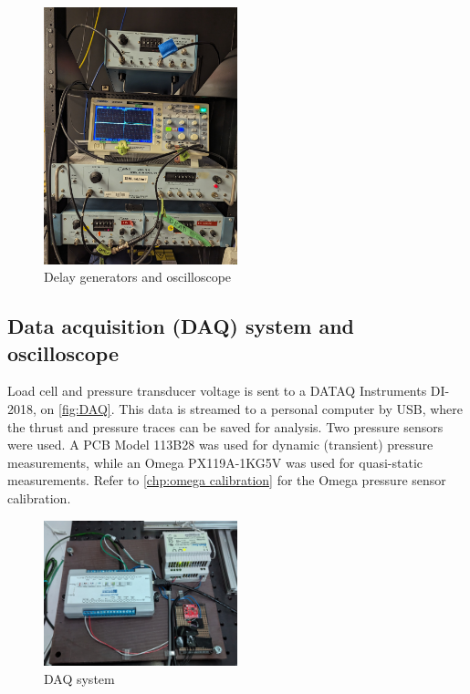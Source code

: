             \begin{figure}[!ht]
                \centering
                \includegraphics[width=0.50\textwidth]{assets/3 design/Timing rack and oscilloscope.jpg}
                \caption{Delay generators and oscilloscope}
                \label{fig:timing section and oscilloscope}
            \end{figure} 

        \subsection{Data acquisition (DAQ) system and oscilloscope}

            Load cell and pressure transducer voltage is sent to a DATAQ Instruments DI-2018, on \autoref{fig:DAQ}. This data is streamed to a personal computer by USB, where the thrust and pressure traces can be saved for analysis. Two pressure sensors were used. A PCB Model 113B28 was used for dynamic (transient) pressure measurements, while an Omega PX119A-1KG5V was used for quasi-static measurements. Refer to \autoref{chp:omega calibration} for the Omega pressure sensor calibration.

            \begin{figure}[!ht]
                \centering
                \includegraphics[width=0.50\textwidth]{assets/3 design/DAQ electronics.jpg}
                \caption{DAQ system}
                \label{fig:DAQ}
            \end{figure}


